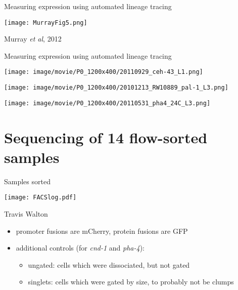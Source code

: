 \documentclass[serif,9pt]{beamer}
\begin{document}
\begin{frame}{Measuring expression using automated lineage tracing}

\texttt{[image: MurrayFig5.png]}

\hfill Murray {\em et al}, 2012

\end{frame}

\begin{frame}{Measuring expression using automated lineage tracing}

{\center
\texttt{[image: image/movie/P0\_1200x400/20110929\_ceh-43\_L1.png]}

\texttt{[image: image/movie/P0\_1200x400/20101213\_RW10889\_pal-1\_L3.png]}

\texttt{[image: image/movie/P0\_1200x400/20110531\_pha4\_24C\_L3.png]}

}

\end{frame}

\section{Sequencing of 14 flow-sorted samples}

\begin{frame}{Samples sorted}

\texttt{[image: FACSlog.pdf]}

\hfill Travis Walton

\begin{itemize}

\item promoter fusions are mCherry, protein fusions are GFP

\item additional controls (for {\em cnd-1} and {\em pha-4}):

\begin{itemize}

\item ungated: cells which were dissociated, but not gated

\item singlets: cells which were gated by size, to probably not be clumps

\end{itemize}

\end{itemize}

\end{frame}
\end{document}
